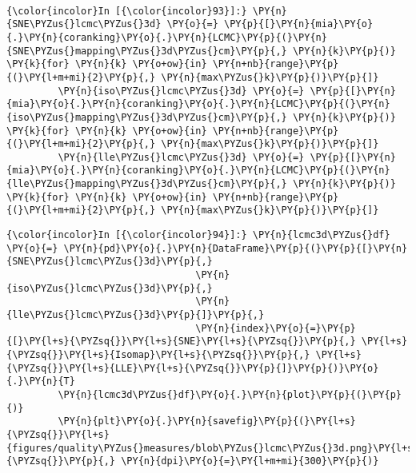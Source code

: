    \begin{center}
    \end{center}
    { \hspace*{\fill} \\}

    \begin{Verbatim}[commandchars=\\\{\}]
{\color{incolor}In [{\color{incolor}93}]:} \PY{n}{SNE\PYZus{}lcmc\PYZus{}3d} \PY{o}{=} \PY{p}{[}\PY{n}{mia}\PY{o}{.}\PY{n}{coranking}\PY{o}{.}\PY{n}{LCMC}\PY{p}{(}\PY{n}{SNE\PYZus{}mapping\PYZus{}3d\PYZus{}cm}\PY{p}{,} \PY{n}{k}\PY{p}{)} \PY{k}{for} \PY{n}{k} \PY{o+ow}{in} \PY{n+nb}{range}\PY{p}{(}\PY{l+m+mi}{2}\PY{p}{,} \PY{n}{max\PYZus{}k}\PY{p}{)}\PY{p}{]}
         \PY{n}{iso\PYZus{}lcmc\PYZus{}3d} \PY{o}{=} \PY{p}{[}\PY{n}{mia}\PY{o}{.}\PY{n}{coranking}\PY{o}{.}\PY{n}{LCMC}\PY{p}{(}\PY{n}{iso\PYZus{}mapping\PYZus{}3d\PYZus{}cm}\PY{p}{,} \PY{n}{k}\PY{p}{)} \PY{k}{for} \PY{n}{k} \PY{o+ow}{in} \PY{n+nb}{range}\PY{p}{(}\PY{l+m+mi}{2}\PY{p}{,} \PY{n}{max\PYZus{}k}\PY{p}{)}\PY{p}{]}
         \PY{n}{lle\PYZus{}lcmc\PYZus{}3d} \PY{o}{=} \PY{p}{[}\PY{n}{mia}\PY{o}{.}\PY{n}{coranking}\PY{o}{.}\PY{n}{LCMC}\PY{p}{(}\PY{n}{lle\PYZus{}mapping\PYZus{}3d\PYZus{}cm}\PY{p}{,} \PY{n}{k}\PY{p}{)} \PY{k}{for} \PY{n}{k} \PY{o+ow}{in} \PY{n+nb}{range}\PY{p}{(}\PY{l+m+mi}{2}\PY{p}{,} \PY{n}{max\PYZus{}k}\PY{p}{)}\PY{p}{]}
\end{Verbatim}

    \begin{Verbatim}[commandchars=\\\{\}]
{\color{incolor}In [{\color{incolor}94}]:} \PY{n}{lcmc3d\PYZus{}df} \PY{o}{=} \PY{n}{pd}\PY{o}{.}\PY{n}{DataFrame}\PY{p}{(}\PY{p}{[}\PY{n}{SNE\PYZus{}lcmc\PYZus{}3d}\PY{p}{,}
                                 \PY{n}{iso\PYZus{}lcmc\PYZus{}3d}\PY{p}{,}
                                 \PY{n}{lle\PYZus{}lcmc\PYZus{}3d}\PY{p}{]}\PY{p}{,}
                                 \PY{n}{index}\PY{o}{=}\PY{p}{[}\PY{l+s}{\PYZsq{}}\PY{l+s}{SNE}\PY{l+s}{\PYZsq{}}\PY{p}{,} \PY{l+s}{\PYZsq{}}\PY{l+s}{Isomap}\PY{l+s}{\PYZsq{}}\PY{p}{,} \PY{l+s}{\PYZsq{}}\PY{l+s}{LLE}\PY{l+s}{\PYZsq{}}\PY{p}{]}\PY{p}{)}\PY{o}{.}\PY{n}{T}
         \PY{n}{lcmc3d\PYZus{}df}\PY{o}{.}\PY{n}{plot}\PY{p}{(}\PY{p}{)}
         \PY{n}{plt}\PY{o}{.}\PY{n}{savefig}\PY{p}{(}\PY{l+s}{\PYZsq{}}\PY{l+s}{figures/quality\PYZus{}measures/blob\PYZus{}lcmc\PYZus{}3d.png}\PY{l+s}{\PYZsq{}}\PY{p}{,} \PY{n}{dpi}\PY{o}{=}\PY{l+m+mi}{300}\PY{p}{)}
\end{Verbatim}


